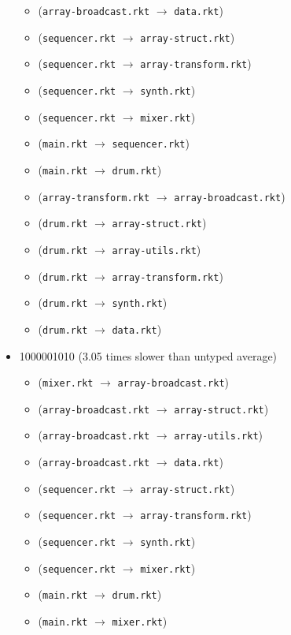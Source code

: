 \documentclass{article}
\newcommand{\mono}[1]{\texttt{#1}}
\begin{document}
\begin{itemize}
\begin{itemize}
  \item (\mono{array-broadcast.rkt} $\rightarrow$ \mono{data.rkt})
  \item (\mono{sequencer.rkt} $\rightarrow$ \mono{array-struct.rkt})
  \item (\mono{sequencer.rkt} $\rightarrow$ \mono{array-transform.rkt})
  \item (\mono{sequencer.rkt} $\rightarrow$ \mono{synth.rkt})
  \item (\mono{sequencer.rkt} $\rightarrow$ \mono{mixer.rkt})
  \item (\mono{main.rkt} $\rightarrow$ \mono{sequencer.rkt})
  \item (\mono{main.rkt} $\rightarrow$ \mono{drum.rkt})
  \item (\mono{array-transform.rkt} $\rightarrow$ \mono{array-broadcast.rkt})
  \item (\mono{drum.rkt} $\rightarrow$ \mono{array-struct.rkt})
  \item (\mono{drum.rkt} $\rightarrow$ \mono{array-utils.rkt})
  \item (\mono{drum.rkt} $\rightarrow$ \mono{array-transform.rkt})
  \item (\mono{drum.rkt} $\rightarrow$ \mono{synth.rkt})
  \item (\mono{drum.rkt} $\rightarrow$ \mono{data.rkt})
  \end{itemize}
\item 1000001010 (3.05 times slower than untyped average)
  \begin{itemize}
  \item (\mono{mixer.rkt} $\rightarrow$ \mono{array-broadcast.rkt})
  \item (\mono{array-broadcast.rkt} $\rightarrow$ \mono{array-struct.rkt})
  \item (\mono{array-broadcast.rkt} $\rightarrow$ \mono{array-utils.rkt})
  \item (\mono{array-broadcast.rkt} $\rightarrow$ \mono{data.rkt})
  \item (\mono{sequencer.rkt} $\rightarrow$ \mono{array-struct.rkt})
  \item (\mono{sequencer.rkt} $\rightarrow$ \mono{array-transform.rkt})
  \item (\mono{sequencer.rkt} $\rightarrow$ \mono{synth.rkt})
  \item (\mono{sequencer.rkt} $\rightarrow$ \mono{mixer.rkt})
  \item (\mono{main.rkt} $\rightarrow$ \mono{drum.rkt})
  \item (\mono{main.rkt} $\rightarrow$ \mono{mixer.rkt})

\end{itemize}
\end{itemize}
\end{document}
